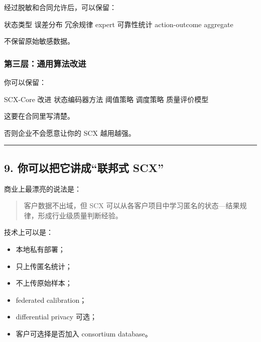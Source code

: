 \documentclass[
  12pt,
]{ctexart}
\newenvironment{Shaded}{}{}
\newcommand{\NormalTok}[1]{#1}
\providecommand{\tightlist}{%
  \setlength{\itemsep}{0pt}\setlength{\parskip}{0pt}}
\begin{document}
经过脱敏和合同允许后，可以保留：

\begin{Shaded}
\begin{Highlighting}[]
\NormalTok{状态类型}
\NormalTok{误差分布}
\NormalTok{冗余规律}
\NormalTok{expert 可靠性统计}
\NormalTok{action{-}outcome aggregate}
\end{Highlighting}
\end{Shaded}

不保留原始敏感数据。

\subsubsection{第三层：通用算法改进}\label{ux7b2cux4e09ux5c42ux901aux7528ux7b97ux6cd5ux6539ux8fdb}

你可以保留：

\begin{Shaded}
\begin{Highlighting}[]
\NormalTok{SCX{-}Core 改进}
\NormalTok{状态编码器方法}
\NormalTok{阈值策略}
\NormalTok{调度策略}
\NormalTok{质量评价模型}
\end{Highlighting}
\end{Shaded}

这要在合同里写清楚。

否则企业不会愿意让你的 SCX 越用越强。

\begin{center}\rule{0.5\linewidth}{0.5pt}\end{center}

\subsection{9. 你可以把它讲成``联邦式
SCX''}\label{ux4f60ux53efux4ee5ux628aux5b83ux8bb2ux6210ux8054ux90a6ux5f0f-scx}

商业上最漂亮的说法是：

\begin{quote}
客户数据不出域，但 SCX
可以从各客户项目中学习匿名的状态---结果规律，形成行业级质量判断经验。
\end{quote}

技术上可以是：

\begin{itemize}
\tightlist
\item
  本地私有部署；
\item
  只上传匿名统计；
\item
  不上传原始样本；
\item
  federated calibration；
\item
  differential privacy 可选；
\item
  客户可选择是否加入 consortium database。
\end{itemize}
\end{document}
